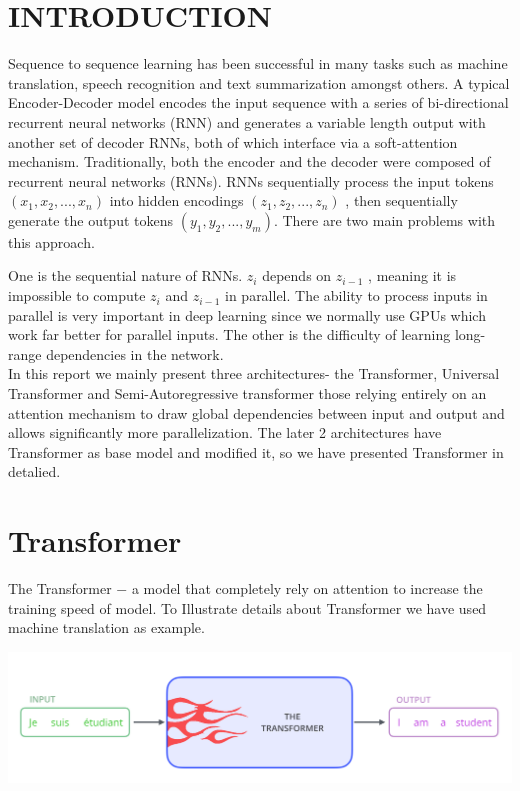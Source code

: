 \documentclass{article}
\begin{document}
	\begin{multicols}{2}
	\section{INTRODUCTION}
Sequence to sequence learning has been successful in many tasks such as machine translation, speech recognition and text summarization amongst others. A typical Encoder-Decoder model encodes the input sequence with a series of bi-directional recurrent neural networks (RNN) and generates a variable length output with another set of decoder RNNs, both of which interface via a soft-attention mechanism.
Traditionally, both the encoder and the decoder were composed of recurrent neural networks (RNNs). RNNs sequentially process the input tokens $(x_1, x_2, ... , x_n)$  into hidden encodings $(z_1, z_2, ... , z_n)$ , then sequentially generate the output tokens $(y_1, y_2, ... , y_m)$. There are two main problems with this approach.

One is the sequential nature of RNNs. $z_i$  depends on $z_{i-1}$ , meaning it is impossible to compute $z_i$  and $z_{i-1}$  in parallel. The ability to process inputs in parallel is very important in deep learning since we normally use GPUs which work far better for parallel inputs. The other is the difficulty of learning long-range dependencies in the network. 
\\ In this report we mainly present three architectures- the Transformer, Universal Transformer and Semi-Autoregressive transformer those relying entirely on an attention mechanism to draw global dependencies between input and output and  allows significantly more parallelization. The later 2 architectures have Transformer as base model and modified it, so we have presented Transformer in detalied.
		
	\section{Transformer}
The Transformer $-$ a model that completely rely on attention to increase the training speed of model. To Illustrate details about Transformer we have used machine translation as example.


\begin{center}
\captionsetup{type=figure}
        \includegraphics[width=.47\textwidth]{the_transformer_blackbox.png}
\end{center}


\end{multicols}
\end{document}
